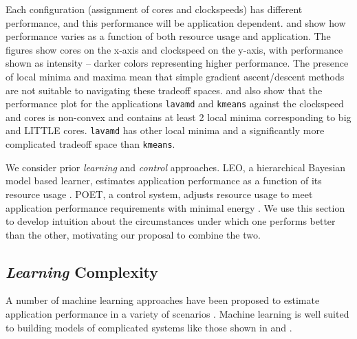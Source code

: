 Each configuration (assignment of cores and clockspeeds) has different
performance, and this performance will be application dependent.
 and  show how
performance varies as a function of both resource usage and
application.  The figures show cores on the x-axis and clockspeed on
the y-axis, with performance shown as intensity -- darker colors
representing higher performance. The presence of local minima and
maxima mean that simple gradient ascent/descent methods are not
suitable to navigating these tradeoff spaces.
 and  also show
that the performance plot for the applications \texttt{lavamd} and
\texttt{kmeans} against the clockspeed and cores is non-convex and
contains at least 2 local minima corresponding to big and LITTLE
cores.  \texttt{lavamd} has other local minima and a significantly
more complicated tradeoff space than \texttt{kmeans}.


We consider prior \emph{learning} and \emph{control} approaches.  LEO,
a hierarchical Bayesian model based learner, estimates application
performance as a function of its resource usage \cite{LEO}. POET, a
control system, adjusts resource usage to meet application performance
requirements with minimal energy \cite{POET}.  We use this section to
develop intuition about the circumstances under which one performs
better than the other, motivating our proposal to combine the two.

\subsection{\emph{Learning} Complexity}
A number of machine learning approaches have been proposed to estimate
application performance in a variety of scenarios
\cite{reddiHPCA2013,LeeBrooks2006,CPR,ParallelismDial,Flicker,LeeBrooks,Koala}.
Machine learning is well suited to building models of complicated
systems like those shown in  and
 .

